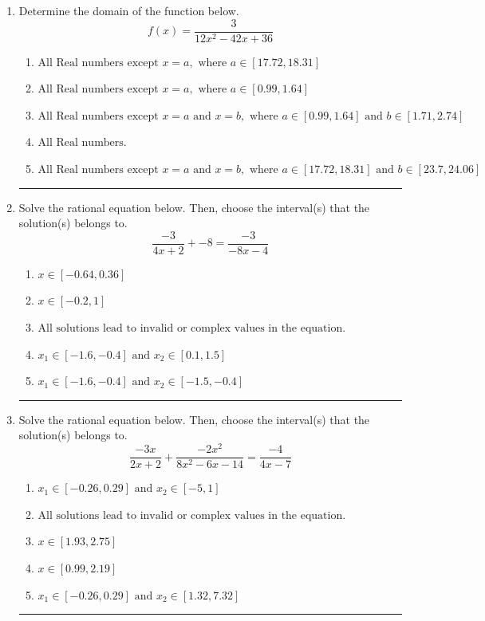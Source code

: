 \documentclass[14pt]{extbook}
\newcommand{\litem}[1]{\item#1\hspace*{-1cm}\rule{\textwidth}{0.4pt}}
\begin{document}
\begin{enumerate}
\litem{
Determine the domain of the function below.\[ f(x) = \frac{3}{12x^{2} -42 x + 36} \]\begin{enumerate}[label=\Alph*.]
\item \( \text{All Real numbers except } x = a, \text{ where } a \in [17.72, 18.31] \)
\item \( \text{All Real numbers except } x = a, \text{ where } a \in [0.99, 1.64] \)
\item \( \text{All Real numbers except } x = a \text{ and } x = b, \text{ where } a \in [0.99, 1.64] \text{ and } b \in [1.71, 2.74] \)
\item \( \text{All Real numbers.} \)
\item \( \text{All Real numbers except } x = a \text{ and } x = b, \text{ where } a \in [17.72, 18.31] \text{ and } b \in [23.7, 24.06] \)

\end{enumerate} }
\litem{
Solve the rational equation below. Then, choose the interval(s) that the solution(s) belongs to.\[ \frac{-3}{4x + 2} + -8 = \frac{-3}{-8x -4} \]\begin{enumerate}[label=\Alph*.]
\item \( x \in [-0.64,0.36] \)
\item \( x \in [-0.2,1] \)
\item \( \text{All solutions lead to invalid or complex values in the equation.} \)
\item \( x_1 \in [-1.6, -0.4] \text{ and } x_2 \in [0.1,1.5] \)
\item \( x_1 \in [-1.6, -0.4] \text{ and } x_2 \in [-1.5,-0.4] \)

\end{enumerate} }
\litem{
Solve the rational equation below. Then, choose the interval(s) that the solution(s) belongs to.\[ \frac{-3x}{2x + 2} + \frac{-2x^{2}}{8x^{2} -6 x -14} = \frac{-4}{4x -7} \]\begin{enumerate}[label=\Alph*.]
\item \( x_1 \in [-0.26, 0.29] \text{ and } x_2 \in [-5,1] \)
\item \( \text{All solutions lead to invalid or complex values in the equation.} \)
\item \( x \in [1.93,2.75] \)
\item \( x \in [0.99,2.19] \)
\item \( x_1 \in [-0.26, 0.29] \text{ and } x_2 \in [1.32,7.32] \)


\end{enumerate}}
\end{enumerate}
\end{document}
